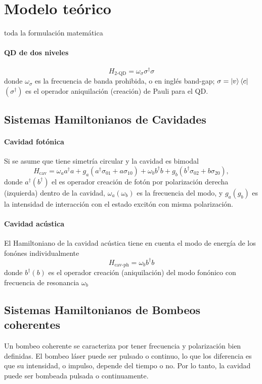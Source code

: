 \documentclass[main.tex]{subfiles}
\begin{document}
\chapter{Modelo teórico}
toda la formulación matemática

\subsubsection{QD de dos niveles}
\begin{equation}
	H_\text{2-QD} = \omega_\sigma \sigma^\dagger \sigma
\end{equation}
donde $\omega_\sigma$ es la frecuencia de banda prohibida, o en inglés band-gap; $\sigma = \ket{v}\bra{c}$  $(\sigma^\dagger)$ es el operador aniquilación (creación) de Pauli para el QD.

\section{Sistemas Hamiltonianos de Cavidades}
\subsubsection{Cavidad fotónica}
Si se asume que tiene simetría circular y la cavidad es bimodal
\begin{equation}\label{eq:H_cav}
	H_\text{cav} = \omega_a a^\dagger a + g_a (a^\dagger \sigma_{01} + a \sigma_{10}) + \omega_b b^\dagger b + g_b (b^\dagger \sigma_{02} + b \sigma_{20}),
\end{equation}
donde $a^\dagger (b^\dagger)$ el es operador creación de fotón por polarización derecha (izquierda) dentro de la cavidad, $\omega_a (\omega_b)$ es la frecuencia del modo, y $g_a(g_b)$ es la intensidad de interacción con el estado excitón con misma polarización.

\subsubsection{Cavidad acústica}
El Hamiltoniano de la cavidad acústica tiene en cuenta el modo de energía de los fonónes individualmente
\begin{equation}\label{eq:H_cav-ph}
	H_\text{cav-ph} = \omega_b b^\dagger b
\end{equation}
donde $b^\dagger (b)$ es el operador creación (aniquilación) del modo fonónico con frecuencia de resonancia $\omega_b$

\section{Sistemas Hamiltonianos de Bombeos coherentes}
Un bombeo coherente se caracteriza por tener frecuencia y polarización bien definidas. El bombeo láser puede ser pulsado o continuo, lo que los diferencia es que su intensidad, o impulso, depende del tiempo o no. Por lo tanto, la cavidad puede ser bombeada pulsada o continuamente.
\end{document}
